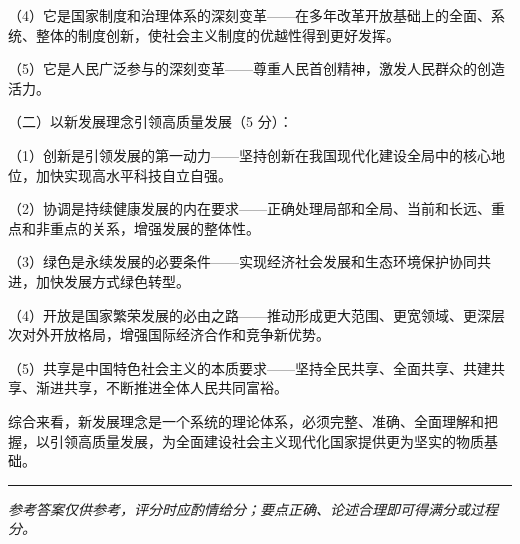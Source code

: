 \documentclass[12pt, a4paper]{article}
\newcommand{\examrule}{\noindent\rule{\linewidth}{0.6pt}}
\begin{document}
\begin{answerbox}
（4）它是国家制度和治理体系的深刻变革——在多年改革开放基础上的全面、系统、整体的制度创新，使社会主义制度的优越性得到更好发挥。

（5）它是人民广泛参与的深刻变革——尊重人民首创精神，激发人民群众的创造活力。

\noindent（二）以新发展理念引领高质量发展（5 分）：

（1）创新是引领发展的第一动力——坚持创新在我国现代化建设全局中的核心地位，加快实现高水平科技自立自强。

（2）协调是持续健康发展的内在要求——正确处理局部和全局、当前和长远、重点和非重点的关系，增强发展的整体性。

（3）绿色是永续发展的必要条件——实现经济社会发展和生态环境保护协同共进，加快发展方式绿色转型。

（4）开放是国家繁荣发展的必由之路——推动形成更大范围、更宽领域、更深层次对外开放格局，增强国际经济合作和竞争新优势。

（5）共享是中国特色社会主义的本质要求——坚持全民共享、全面共享、共建共享、渐进共享，不断推进全体人民共同富裕。

\vspace{4pt}
\noindent 综合来看，新发展理念是一个系统的理论体系，必须完整、准确、全面理解和把握，以引领高质量发展，为全面建设社会主义现代化国家提供更为坚实的物质基础。

\end{answerbox}

\vspace{12pt}
\examrule
\begin{center}
  \textit{参考答案仅供参考，评分时应酌情给分；要点正确、论述合理即可得满分或过程分。}
\end{center}
\end{document}
